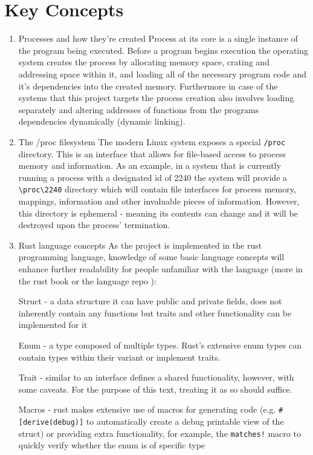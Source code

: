 \section{Key Concepts}

\begin{enumerate}
    \item {Processes and how they're created}
Process at its core is a single instance of the program being executed.
    Before a program begins execution the operating system creates the process by allocating memory space, crating and addressing space within it, and loading all of the necessary program code and it's dependencies into the created memory.
    Furthermore in case of the systems that this project targets the process creation also involves loading separately and altering addresses of functions from the programs dependencies dynamically (dynamic linking).
    
    \item{The /proc filesystem}
    The modern Linux system exposes a special \verb|/proc| directory.
    This is an interface that allows for file-based access to process memory and information.
    As an example, in a system that is currently running a process with a designated id of 2240 the system will provide a \verb|\proc\2240| directory which will contain file interfaces for process memory, mappings, information and other invaluable pieces of information.
    However, this directory is ephemeral - meaning its contents can change and it will be destroyed upon the process' termination.

    \item{ Rust language concepts}
As the project is implemented in the rust programming language, knowledge of some basic language concepts will enhance further readability for people unfamiliar with the language (more in the rust book \cite{klabnik_rust_2023} or the language repo \cite{rust_foundation_rust-langrust_2024}): 

\subitem Struct - a data structure it can have public and private fields, does not inherently contain any functions but traits and other functionality can be implemented for it

    \subitem Enum - a type composed of multiple types. Rust's extensive enum types can contain types within their variant or implement traits.
    
    \subitem Trait - similar to an interface defines a shared functionality, however, with some caveats. For the purpose of this text, treating it as so should suffice.
    
    \subitem Macros - rust makes extensive use of macros for generating code (e.g. \verb|#[derive(debug)]| to automatically create a debug printable view of the struct) or providing extra functionality, for example, the \verb|matches!| macro to quickly verify whether the enum is of specific type 
\end{enumerate}